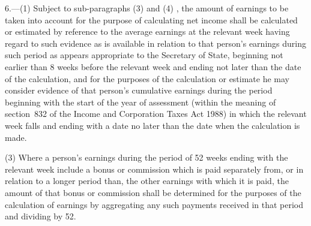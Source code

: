 \documentclass[12pt,a4paper]{article}
\begin{document}
6.---(1)  Subject to 
sub-paragraphs (3) and (4)%
, the amount of earnings to be taken into account for the purpose of calculating net income shall be calculated or estimated by reference to the average earnings at the relevant week having regard to such evidence as is available in relation to that person’s earnings during such period as appears appropriate to the Secretary of State, beginning not earlier than 8 weeks before the relevant week and ending not later than the date of the calculation, and for the purposes of the calculation or estimate he may consider evidence of that person’s cumulative earnings during the period beginning with the start of the year of assessment (within the meaning of section~832 of the Income and Corporation Taxes Act 1988) in which the relevant week falls and ending with a date no later than the date when the calculation is made.


(3) Where a person’s earnings during the period of 52 weeks ending with the relevant week include a bonus or commission 
which is paid separately from, or in relation to a longer period than, the other earnings with which it is paid, the amount of that bonus or commission shall be determined for the purposes of the calculation of earnings by aggregating any such payments received in that period and dividing by 52.
\end{document}

